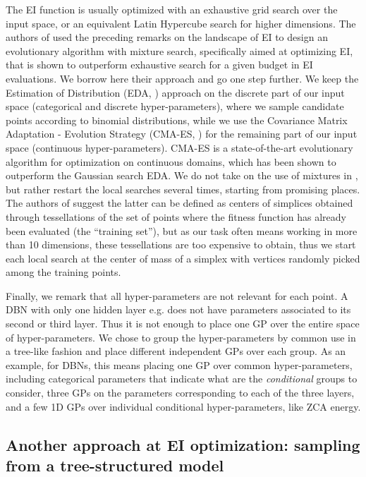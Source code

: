 \documentclass{article}
\newcommand{\vs}[1]{\vspace*{-#1mm}}
\newcommand{\Bss}{\vs{1}}
\newcommand{\ass}{\vs{0.7}}
\begin{document}
The EI function is usually optimized with an exhaustive grid search
over the input space, or an equivalent Latin Hypercube search for
higher dimensions. The authors of \cite{BaKe10} used the
preceding remarks on the landscape of EI to design an evolutionary
algorithm with mixture search, specifically aimed at optimizing EI,
that is shown to outperform exhaustive search for a given budget in EI
evaluations. We borrow here their approach and go one step further. We keep the
Estimation of Distribution (EDA, \cite{LaLo01}) approach on the discrete
part of our input space (categorical and
discrete hyper-parameters), where we sample candidate points according
to binomial distributions, while we use the Covariance Matrix Adaptation -
Evolution Strategy (CMA-ES, \cite{Han06}) for the remaining part of
our input space (continuous hyper-parameters). CMA-ES is a
state-of-the-art evolutionary algorithm for optimization on continuous
domains, which has been shown to outperform the Gaussian search
EDA. We do not take on the use
of mixtures in \cite{BaKe10}, but rather restart the local searches
several times, starting from promising places. The authors of
\cite{BaKe10} suggest
the latter can be defined as centers of simplices obtained through
tessellations of the set of points where the fitness function has
already been evaluated (the ``training set''), but as our task often means
working in more than 10 dimensions, these tessellations are too
expensive to obtain, thus we start each local search at the center of mass of a
simplex with vertices randomly picked among the training points.

Finally, we remark that all hyper-parameters are not relevant for each
point. A DBN with only
one hidden layer e.g. does not have parameters associated to its second or
third layer. Thus it is not enough to place one GP over the entire
space of hyper-parameters. We chose to group the hyper-parameters by
common use in a tree-like fashion and place different independent GPs
over each group. As an example, for DBNs, this means placing one GP over common
hyper-parameters, including categorical parameters that indicate what
are the {\it conditional} groups to consider, three GPs on the
parameters corresponding to each of the three layers, and a few 1D GPs
over individual conditional hyper-parameters, like ZCA
energy.

\Bss
\subsection{Another approach at EI optimization: sampling from a
  tree-structured model}
\label{ss:tree}
\ass
\end{document}
